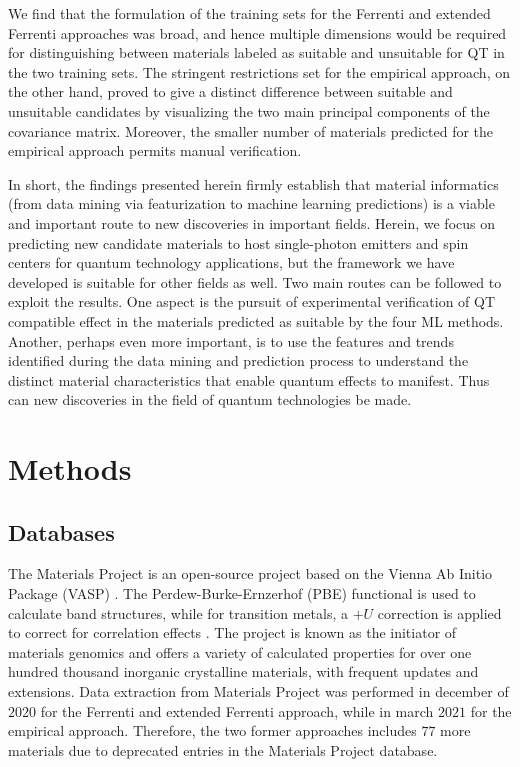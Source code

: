 \documentclass[superscriptaddress,unsortedaddress,
 amsmath,amssymb,
 aps,
]{revtex4-2}
\begin{document}
We find that the formulation of the training sets for the Ferrenti and extended Ferrenti approaches was broad, and hence multiple dimensions would be required for distinguishing between materials labeled as suitable and unsuitable for QT in the two training sets. The stringent restrictions set for the empirical approach, on the other hand, proved to give a distinct difference between suitable and unsuitable candidates by visualizing the two main principal components of the covariance matrix. 
Moreover, the smaller number of materials predicted for the empirical approach permits manual verification. 

In short, the findings presented herein firmly establish that material informatics (from data mining via featurization to machine learning predictions) is a viable and important route to new discoveries in important fields.  Herein, we focus on predicting new candidate materials to host single-photon emitters and spin centers for quantum technology applications, but the framework we have developed is suitable for other fields as well. 
Two main routes can be followed to exploit the results. One aspect is the pursuit of experimental verification of QT compatible effect in the materials predicted as suitable by the four ML methods. Another, perhaps even more important, is to use the features and trends identified during the data mining and prediction process to understand the distinct material characteristics that enable quantum effects to manifest. Thus can new discoveries in the field of quantum technologies be made. 


\section*{Methods}

\subsection*{Databases}
The Materials Project \cite{Jain2013, Jain2018} is an open-source project based on the Vienna Ab Initio Package (VASP) \cite{Kresse1996}. The Perdew-Burke-Ernzerhof \cite{Perdew1996} (PBE) functional is used to calculate band structures, while for transition metals, a $+U$ correction is applied to correct for correlation effects \cite{Wang2006}. The project is known as the initiator of materials genomics and offers a variety of calculated properties for over one hundred thousand inorganic crystalline materials, with frequent updates and extensions. Data extraction from Materials Project was performed in december of $2020$ for the Ferrenti and extended Ferrenti approach, while in march $2021$ for the empirical approach. Therefore, the two former approaches includes $77$ more materials due to deprecated entries in the Materials Project database.
\end{document}
